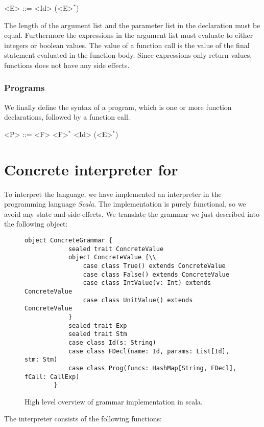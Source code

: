 \begin{grammar}
	<E> ::= <Id> (<E>$^{*}$) 
\end{grammar}

The length of the argument list and the parameter list in the declaration must be equal. Furthermore the expressions in the argument list must evaluate to either integers or  boolean values.
The value of a function call is the value of the final statement evaluated in the function body. Since expressions only return values, functions does not have any side effects.


\subsubsection{Programs}
We finally define the syntax of a \explanguage program, which is one or more function declarations, followed by a function call. 

\begin{grammar}
	<P> ::= <F> <F>$^{*}$  <Id> (<E>$^{*}$) 
\end{grammar}

\section{Concrete interpreter for \explanguage}
To interpret the language, we have implemented an interpreter in the programming language \textsl{Scala}. The implementation is purely functional, so we avoid any state and side-effects. We translate the grammar we just described into the following object:

\begin{figure}[!h]
	\begin{lstlisting}[style=complex]
		object ConcreteGrammar {
			sealed trait ConcreteValue
			object ConcreteValue {\\
				case class True() extends ConcreteValue
				case class False() extends ConcreteValue
				case class IntValue(v: Int) extends ConcreteValue
				case class UnitValue() extends ConcreteValue
			}
			sealed trait Exp
			sealed trait Stm
			case class Id(s: String)
			case class FDecl(name: Id, params: List[Id], stm: Stm)
			case class Prog(funcs: HashMap[String, FDecl], fCall: CallExp)	
		}
	\end{lstlisting}
	\caption{High level overview of grammar implementation in scala.}
\end{figure}

The interpreter consists of the following functions:

